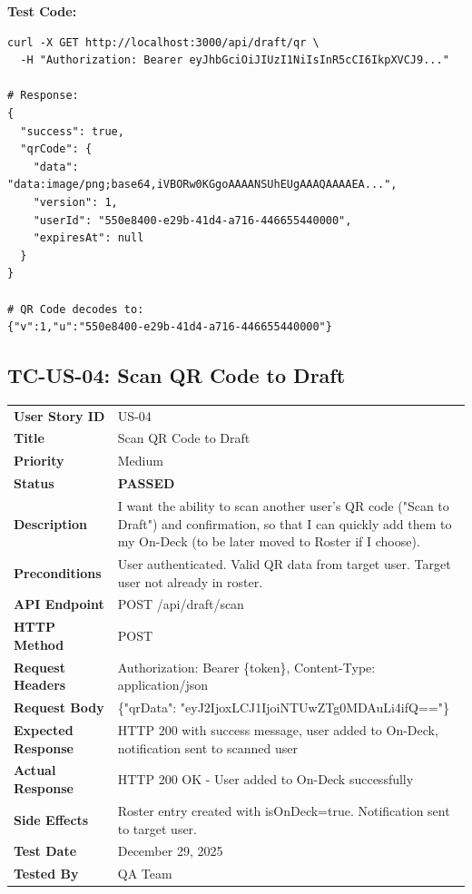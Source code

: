 \documentclass[11pt,a4paper]{article}
\newcommand{\passed}{\textcolor{pass}{\textbf{PASSED}}}
\begin{document}
\vspace{0.3cm}
\textbf{Test Code:}
\begin{lstlisting}
curl -X GET http://localhost:3000/api/draft/qr \
  -H "Authorization: Bearer eyJhbGciOiJIUzI1NiIsInR5cCI6IkpXVCJ9..."

# Response:
{
  "success": true,
  "qrCode": {
    "data": "data:image/png;base64,iVBORw0KGgoAAAANSUhEUgAAAQAAAAEA...",
    "version": 1,
    "userId": "550e8400-e29b-41d4-a716-446655440000",
    "expiresAt": null
  }
}

# QR Code decodes to:
{"v":1,"u":"550e8400-e29b-41d4-a716-446655440000"}
\end{lstlisting}

\vspace{0.5cm}


\subsection{TC-US-04: Scan QR Code to Draft}

\begin{tabularx}{\textwidth}{|p{3.2cm}|Y|}
\hline
{}
 \\
\hline
\textbf{User Story ID} & US-04 \\
\hline
\textbf{Title} & Scan QR Code to Draft \\
\hline
\textbf{Priority} & Medium \\
\hline
\textbf{Status} & \passed \\
\hline
\textbf{Description} & I want the ability to scan another user's QR code ("Scan to Draft") and confirmation, so that I can quickly add them to my On-Deck (to be later moved to Roster if I choose). \\
\hline
\textbf{Preconditions} & User authenticated. Valid QR data from target user. Target user not already in roster. \\
\hline
\textbf{API Endpoint} & POST /api/draft/scan \\
\hline
\textbf{HTTP Method} & POST \\
\hline
\textbf{Request Headers} & Authorization: Bearer \{token\}, Content-Type: application/json \\
\hline
\textbf{Request Body} & \{"qrData": "eyJ2IjoxLCJ1IjoiNTUwZTg0MDAuLi4ifQ=="\} \\
\hline
\textbf{Expected Response} & HTTP 200 with success message, user added to On-Deck, notification sent to scanned user \\
\hline
\textbf{Actual Response} & HTTP 200 OK - User added to On-Deck successfully \\
\hline
\textbf{Side Effects} & Roster entry created with isOnDeck=true. Notification sent to target user. \\
\hline
\textbf{Test Date} & December 29, 2025 \\
\hline
\textbf{Tested By} & QA Team \\
\hline
\end{tabularx}
\end{document}
